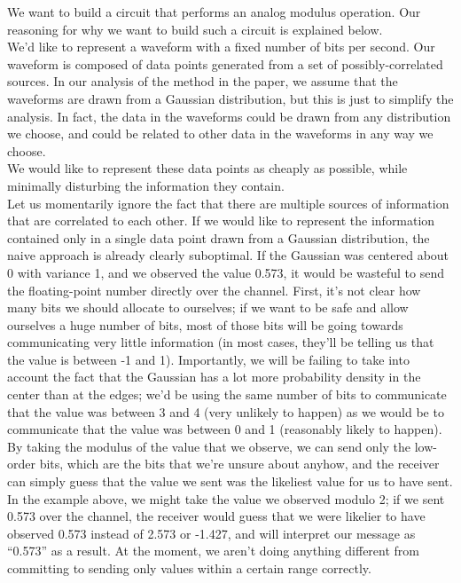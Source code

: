 \documentclass{amsart}
\begin{document}
We want to build a circuit that performs an analog modulus operation. Our reasoning for why we want to build such a circuit is explained below. \\

We'd like to represent a waveform with a fixed number of bits per second.
Our waveform is composed of data points generated from a set of possibly-correlated sources. In our analysis of the method in the paper, we assume that the waveforms are drawn from a Gaussian distribution, but this is just to simplify the analysis. In fact, the data in the waveforms could be drawn from any distribution we choose, and could be related to other data in the waveforms in any way we choose. \\

We would like to represent these data points as cheaply as possible, while minimally disturbing the information they contain. \\

Let us momentarily ignore the fact that there are multiple sources of information that are correlated to each other. If we would like to represent the information contained only in a single data point drawn from a Gaussian distribution, the naive approach is already clearly suboptimal. If the Gaussian was centered about 0 with variance 1, and we observed the value 0.573, it would be wasteful to send the floating-point number directly over the channel. First, it's not clear how many bits we should allocate to ourselves; if we want to be safe and allow ourselves a huge number of bits, most of those bits will be going towards communicating very little information (in most cases, they'll be telling us that the value is between -1 and 1). Importantly, we will be failing to take into account the fact that the Gaussian has a lot more probability density in the center than at the edges; we'd be using the same number of bits to communicate that the value was between 3 and 4 (very unlikely to happen) as we would be to communicate that the value was between 0 and 1 (reasonably likely to happen). \\

By taking the modulus of the value that we observe, we can send only the low-order bits, which are the bits that we're unsure about anyhow, and the receiver can simply guess that the value we sent was the likeliest value for us to have sent. In the example above, we might take the value we observed modulo 2; if we sent 0.573 over the channel, the receiver would guess that we were likelier to have observed 0.573 instead of 2.573 or -1.427, and will interpret our message as ``0.573'' as a result. At the moment, we aren't doing anything different from committing to sending only values within a certain range correctly. \\
\end{document}
